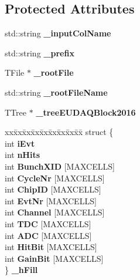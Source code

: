 \subsection*{Protected Attributes}
\begin{DoxyCompactItemize}
\item 
std::string {\bfseries \_\-inputColName}\label{classCALICE_1_1RootTreeGeneratorEUDAQ2016_ac2e510fb22f7812c6daee89b12ac9c3b}

\item 
std::string {\bfseries \_\-prefix}\label{classCALICE_1_1RootTreeGeneratorEUDAQ2016_a322f00e45091686e6d9b9c8ead72dd4a}

\item 
TFile $\ast$ {\bfseries \_\-rootFile}\label{classCALICE_1_1RootTreeGeneratorEUDAQ2016_a909e0073fa5d088d1c244d36268a31f0}

\item 
std::string {\bfseries \_\-rootFileName}\label{classCALICE_1_1RootTreeGeneratorEUDAQ2016_a8bfc2d4f1ab531348913b77c6ac1ee12}

\item 
TTree $\ast$ {\bfseries \_\-treeEUDAQBlock2016}\label{classCALICE_1_1RootTreeGeneratorEUDAQ2016_afa4dbf097c8ef24ba83e4a485d416d94}

\item 
\begin{tabbing}
xx\=xx\=xx\=xx\=xx\=xx\=xx\=xx\=xx\=\kill
struct \{\\
\>int {\bfseries iEvt}\\
\>int {\bfseries nHits}\\
\>int {\bfseries BunchXID} [MAXCELLS]\\
\>int {\bfseries CycleNr} [MAXCELLS]\\
\>int {\bfseries ChipID} [MAXCELLS]\\
\>int {\bfseries EvtNr} [MAXCELLS]\\
\>int {\bfseries Channel} [MAXCELLS]\\
\>int {\bfseries TDC} [MAXCELLS]\\
\>int {\bfseries ADC} [MAXCELLS]\\
\>int {\bfseries HitBit} [MAXCELLS]\\
\>int {\bfseries GainBit} [MAXCELLS]\\
\} {\bfseries \_hFill}\label{classCALICE_1_1RootTreeGeneratorEUDAQ2016_a4340cd1c609e3822224f574558068ecc}
\\

\end{tabbing}\end{DoxyCompactItemize}
